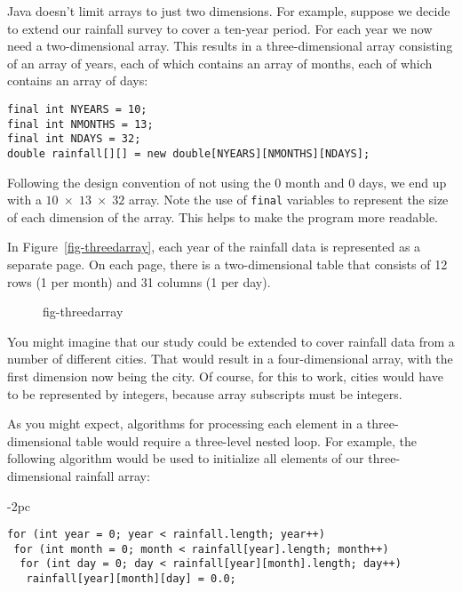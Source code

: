 
\noindent Java doesn't limit arrays to just two dimensions.  For example, suppose
we decide to extend our rainfall survey to cover a ten-year
period.  For each year we now need a two-dimensional array.  This
results in a three-dimensional array consisting of an array of years,
each of which contains an array of months, each of which contains an
array of days:


\begin{jjjlisting}
\begin{lstlisting}
final int NYEARS = 10;
final int NMONTHS = 13;
final int NDAYS = 32;
double rainfall[][] = new double[NYEARS][NMONTHS][NDAYS];
\end{lstlisting}
\end{jjjlisting}

\noindent Following the design convention of not using the
0 month and 0 days, we end up with a $10 \;\times\; 13 \;\times\; 32$ array.
Note the use of {\tt final} variables to represent the size of each
dimension of the array.  This helps to make the program more readable.

In Figure~\ref{fig-threedarray}, each year of the rainfall data is
represented as a separate page. On each page, there is a
two-dimensional table that consists of 12 rows (1 per month) and 31
columns (1 per day).


\begin{figure}[htb]
 {fig-threedarray}
\end{figure}

You might imagine that our study could be extended to
cover rainfall data from a number of different cities.  That would
result in a four-dimensional array, with the first dimension now being
the city.   Of course, for this to work, cities would have to be
represented by integers, because array subscripts must be integers.


As you might expect, algorithms for processing each element
in a three-dimensional table would require a three-level
nested loop.  For example, the following algorithm would
be used to initialize all elements of our three-dimensional
rainfall array:

\begin{jjjlistingleft}[28pc]{-2pc}
\begin{lstlisting}
for (int year = 0; year < rainfall.length; year++)
 for (int month = 0; month < rainfall[year].length; month++)
  for (int day = 0; day < rainfall[year][month].length; day++)
   rainfall[year][month][day] = 0.0;
\end{lstlisting}
\end{jjjlistingleft}


